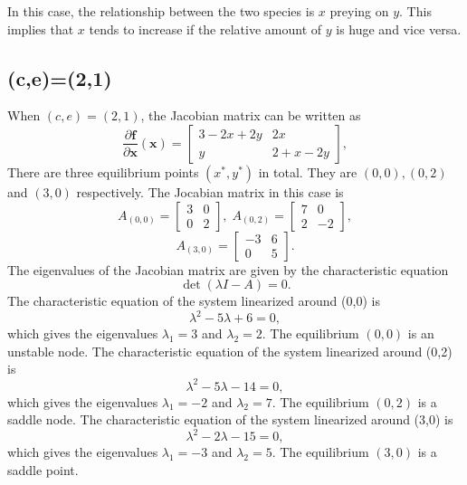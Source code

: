 \documentclass[a4paper,twocolumn]{article} %
\begin{document}
In this case, the relationship between the two species is $x$ preying on $y$. This implies that $x$ tends to increase if the relative amount of $y$ is huge and vice versa.   

\subsection{(c,e)=(2,1)} 
When $(c,e)=(2,1)$, the Jacobian matrix can be written as
\begin{equation*}
    \frac{\partial\textbf{f}}{\partial \textbf{x}}(\textbf{x}) =
    \left[\begin{array}{cc}
    3-2x+2y & 2x \\
    y & 2+x-2y
    \end{array}\right],
\end{equation*}
There are three equilibrium points $(x^*,y^*)$ in total. They are $(0,0),(0,2)$ and $(3,0)$ respectively. The Jocabian matrix in this case is
\begin{equation*}
    A_{(0,0)} =
    \left[\begin{array}{cc}
    3 & 0 \\
    0 & 2
    \end{array}\right], \; A_{(0,2)} =
    \left[\begin{array}{cc}
    7 & 0 \\
    2 & -2
    \end{array}\right],   
    \end{equation*}
    \begin{equation*}
    A_{(3,0)} =
    \left[\begin{array}{cc}
    -3 & 6 \\
    0 & 5
    \end{array}\right].
\end{equation*}
The eigenvalues of the Jacobian matrix are given by the characteristic equation
\begin{equation*}
    \det(\lambda I - A) = 0.
\end{equation*}
The characteristic equation of the system linearized around \mbox{(0,0)} is
\begin{equation*}
    \lambda^2 -5 \lambda + 6 = 0,
\end{equation*}
which gives the eigenvalues $\lambda_{1} = 3$ and $\lambda_{2} = 2$. The equilibrium $(0,0)$ is an unstable node. 
The characteristic equation of the system linearized around \mbox{(0,2)} is
\begin{equation*}
    \lambda^2 -5 \lambda - 14 = 0,
\end{equation*}
which gives the eigenvalues $\lambda_1 = -2$ and $\lambda_2 = 7$. The equilibrium $(0,2)$ is a saddle node. 
The characteristic equation of the system linearized around \mbox{(3,0)} is
\begin{equation*}
    \lambda^2 -2 \lambda - 15 = 0,
\end{equation*}
which gives the eigenvalues $\lambda_1 = -3$ and $\lambda_2 = 5$. The equilibrium $(3,0)$ is a saddle point.
\end{document}
